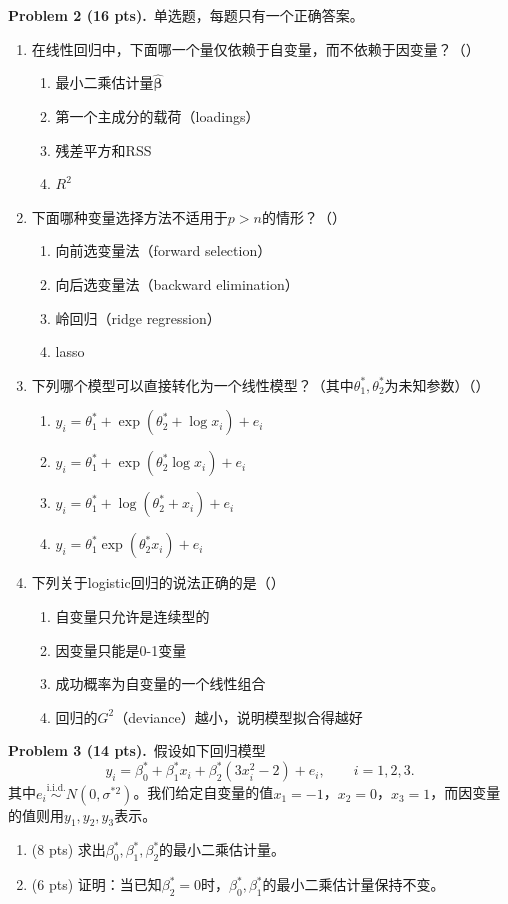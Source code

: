 \documentclass[UTF8,a4paper,11pt,fontset=fandol]{ctexart}
\newenvironment{choices}{\begin{enumerate}[label=(\Alph*),leftmargin=2.3em,itemsep=1pt,topsep=3pt]}{\end{enumerate}}
\newcommand{\blank}{\mbox{（\hspace{1.5em}）}}
\newcommand{\problem}[2]{\par\addvspace{10pt}\Needspace{5\baselineskip}\textbf{Problem #1 (#2 pts).}\ }
\begin{document}
\problem{2}{16}单选题，每题只有一个正确答案。
\begin{enumerate}[itemsep=9pt]
  \item 在线性回归中，下面哪一个量仅依赖于自变量，而不依赖于因变量？\blank
  \begin{choices}
    \item 最小二乘估计量$\widehat{\bm\beta}$
    \item 第一个主成分的载荷（loadings）
    \item 残差平方和RSS
    \item $R^2$
  \end{choices}
  \item 下面哪种变量选择方法不适用于$p>n$的情形？\blank
  \begin{choices}
    \item 向前选变量法（forward selection）
    \item 向后选变量法（backward elimination）
    \item 岭回归（ridge regression）
    \item lasso
  \end{choices}
  \item 下列哪个模型可以直接转化为一个线性模型？（其中$\theta_1^*,\theta_2^*$为未知参数）\blank
  \begin{choices}
    \item $y_i=\theta_1^*+\exp(\theta_2^*+\log x_i)+e_i$
    \item $y_i=\theta_1^*+\exp(\theta_2^*\log x_i)+e_i$
    \item $y_i=\theta_1^*+\log(\theta_2^*+x_i)+e_i$
    \item $y_i=\theta_1^*\exp(\theta_2^*x_i)+e_i$
  \end{choices}
  \item 下列关于logistic回归的说法正确的是\blank
  \begin{choices}
    \item 自变量只允许是连续型的
    \item 因变量只能是0-1变量
    \item 成功概率为自变量的一个线性组合
    \item 回归的$G^2$（deviance）越小，说明模型拟合得越好
  \end{choices}
\end{enumerate}

\problem{3}{14}假设如下回归模型
\begin{equation*}
  y_i=\beta_0^*+\beta_1^*x_i+\beta_2^*(3x_i^2-2)+e_i,\qquad i=1,2,3.
\end{equation*}
其中$e_i\overset{\mathrm{i.i.d.}}{\sim}N(0,\sigma^{*2})$。我们给定自变量的值$x_1=-1$，$x_2=0$，$x_3=1$，而因变量的值则用$y_1,y_2,y_3$表示。
\begin{enumerate}
  \item (8 pts) 求出$\beta_0^*,\beta_1^*,\beta_2^*$的最小二乘估计量。
  \item (6 pts) 证明：当已知$\beta_2^*=0$时，$\beta_0^*,\beta_1^*$的最小二乘估计量保持不变。
\end{enumerate}
\end{document}

